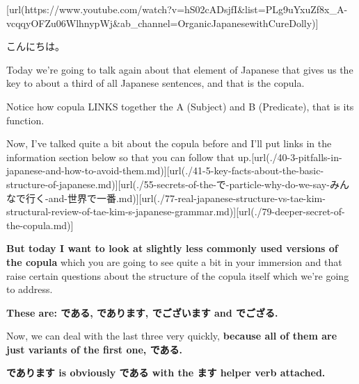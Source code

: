 \startsectionlevel[title={{\bf 84. である and the Structure of Japanese. What older copulas tell us: である, であります、でござる、でございます}},reference={である-and-the-structure-of-japanese.-what-older-copulas-tell-us-である-でありますでござるでございます}]

[url(https://www.youtube.com/watch?v=hS02cADsjfI&list=PLg9uYxuZf8x_A-vcqqyOFZu06WlhnypWj&ab_channel=OrganicJapanesewithCureDolly)]

こんにちは。

Today we're going to talk again about that element of Japanese that gives us the key to about a third of all Japanese sentences, and that is the copula.

{}

Notice how copula LINKS together the A (Subject) and B (Predicate), that is its function.

Now, I've talked quite a bit about the copula before and I'll put links in the information section below so that you can follow that up.\goto{{[}40{]}}[url(./40-3-pitfalls-in-japanese-and-how-to-avoid-them.md)]\goto{{[}41{]}}[url(./41-5-key-facts-about-the-basic-structure-of-japanese.md)]\goto{{[}55{]}}[url(./55-secrets-of-the-で-particle-why-do-we-say-みんなで行く-and-世界で一番.md)]\goto{{[}77{]}}[url(./77-real-japanese-structure-vs-tae-kim-structural-review-of-tae-kim-s-japanese-grammar.md)]\goto{{[}79{]}}[url(./79-deeper-secret-of-the-copula.md)]

{\bf But today I want to look at slightly less commonly used versions of the copula} which you are going to see quite a bit in your immersion and that raise certain questions about the structure of the copula itself which we're going to address.

{}

{\bf These are: である, であります, でございます and でござる.}

Now, we can deal with the last three very quickly, {\bf because all of them are just variants of the first one, である.}

\startsectionlevel[title={であります},reference={であります}]

{\bf であります is obviously である with the ます helper verb attached.}

{}


